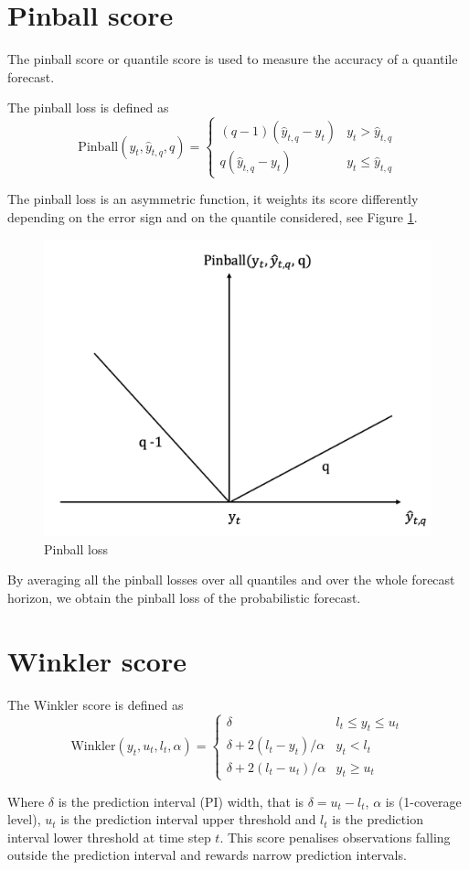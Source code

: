 \section{Pinball score}\label{pinball}
The pinball score or quantile score is used to measure the accuracy of a quantile forecast.
\begin{definition}
    The pinball loss is defined as
    $$
    \mathrm{Pinball}(y_{t},\hat{y}_{t,q},q)=
\begin{cases}
(q-1)(\hat{y}_{t,q}-y_{t}) & y_t > \hat{y}_{t,q} \\
q(\hat{y}_{t,q}-y_t) & y_t \leq \hat{y}_{t,q}
\end{cases}
$$
\end{definition}
The pinball loss is an asymmetric function, it weights its score differently depending on the error sign and on the quantile considered, see Figure \ref{fig:pinball}.
\begin{figure}
    \includegraphics[width=\textwidth]{images/pinball_loss.png}
    \caption{Pinball loss}
    \label{fig:pinball}
  \end{figure}
By averaging all the pinball losses over all quantiles and over the whole forecast horizon, we obtain the pinball loss of the probabilistic forecast.
\section{Winkler score}
\begin{definition}
    The Winkler score is defined as
    $$
    \mathrm{Winkler}(y_t,  u_{t},l_{t},\alpha)=\begin{cases}
        \delta & l_{t}\leq y_{t}\leq u_{t}\\
        \delta+2(l_{t}-y_{t})/\alpha & y_{t}< l_{t}\\
        \delta+2(l_{t}-u_{t})/\alpha & y_{t} \geq u_{t}
    \end{cases}
    $$
\end{definition}
Where $\delta$ is the prediction interval (PI) width, that is $\delta=u_t-l_t$, $\alpha$ is (1-coverage level), $u_t$ is the prediction interval upper threshold and $l_t$ is the prediction interval lower threshold at time step $t$. This score penalises observations falling outside the prediction interval and rewards narrow prediction intervals.
